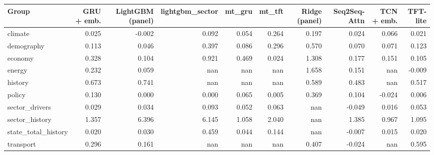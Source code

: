 \begin{tabular}{lrrrrrrrrr}
\toprule
Group & GRU + emb. & LightGBM (panel) & lightgbm_sector & mt_gru & mt_tft & Ridge (panel) & Seq2Seq-Attn & TCN + emb. & TFT-lite \\
\midrule
climate & 0.025 & -0.002 & 0.092 & 0.054 & 0.264 & 0.197 & 0.024 & 0.066 & 0.021 \\
demography & 0.113 & 0.046 & 0.397 & 0.086 & 0.296 & 0.570 & 0.070 & 0.071 & 0.123 \\
economy & 0.328 & 0.104 & 0.921 & 0.469 & 0.024 & 1.308 & 0.177 & 0.151 & 0.105 \\
energy & 0.232 & 0.059 & nan & nan & nan & 1.658 & 0.151 & nan & -0.009 \\
history & 0.673 & 0.741 & nan & nan & nan & 0.589 & 0.483 & nan & 0.517 \\
policy & 0.130 & 0.000 & 0.000 & 0.065 & 0.005 & 0.369 & 0.104 & -0.024 & 0.006 \\
sector_drivers & 0.029 & 0.034 & 0.093 & 0.052 & 0.063 & nan & -0.049 & 0.016 & 0.053 \\
sector_history & 1.357 & 6.396 & 6.145 & 1.058 & 2.040 & nan & 1.385 & 0.967 & 1.095 \\
state_total_history & 0.020 & 0.030 & 0.459 & 0.044 & 0.144 & nan & -0.007 & 0.015 & 0.020 \\
transport & 0.296 & 0.161 & nan & nan & nan & 0.407 & -0.024 & nan & 0.595 \\
\bottomrule
\end{tabular}
